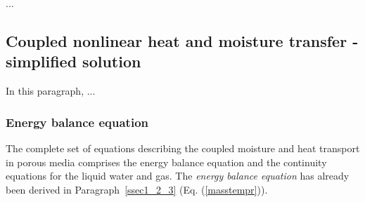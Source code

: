 ...

\subsection{Coupled nonlinear heat and moisture transfer - simplified solution}
\label{seccoupl}

In this paragraph, ...

\subsubsection{Energy balance equation}

The complete set of equations describing the coupled moisture and heat transport in porous media comprises 
the energy balance equation and the continuity equations for the liquid water and gas. 
The {\it energy balance equation} has already been derived in Paragraph~\ref{ssec1_2_3} (Eq. (\ref{masstempr})).

